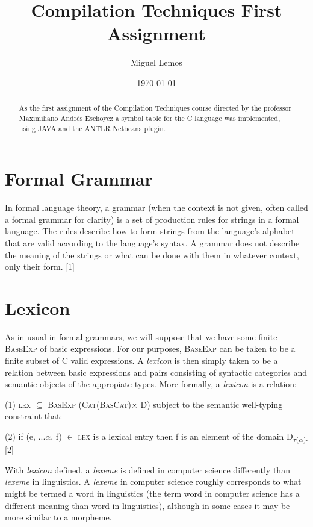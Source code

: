 \documentclass[twocolumn,10ptr]{article}
\author{Miguel Lemos}
\date{\today}
\title{Compilation Techniques First Assignment}
\begin{document}
	
	\twocolumn
	\setlength{\columnsep}{20pt}
	\maketitle
	
	\begin{abstract}
		As the first assignment of the Compilation Techniques course directed by the professor Maximiliano Andr\'{e}s Eschoyez a symbol table for the C language was implemented, using JAVA and the ANTLR Netbeans plugin.
	\end{abstract}
	
	
	
	\section{Formal Grammar}
	In formal language theory, a grammar (when the context is not given, often called a formal grammar for clarity) is a set of production rules for strings in a formal language. The rules describe how to form strings from the language's alphabet that are valid according to the language's syntax. A grammar does not describe the meaning of the strings or what can be done with them in whatever context, only their form.
	[1]
	
	
	
	\section{Lexicon}
	As in usual in formal grammars, we will suppose that we have some finite \textsc{BaseExp} of basic expressions. For our purposes, \textsc{BaseExp}  can be taken to be a finite subset of   C valid expressions. A \textit{lexicon} is then simply taken to be a relation between basic expressions and pairs consisting of syntactic categories and semantic objects of the appropiate types.
	More formally, a \textit{lexicon} is a relation:
	
	(1) \textsc{ lex} \( \subseteq \)  \textsc{ BasExp} (\textsc{Cat}(\textsc{BasCat})\(\times\) D)
	subject to the semantic well-typing constraint that:
	
	(2) if (e, ...\( \alpha \), f) \( \in \)   \textsc{ lex} is a lexical entry then f is an element of the domain D\textsubscript{\(\tau \)(\( \alpha \))\(\cdot\)} [2]
	
	With \textit{lexicon} defined, a \textit{lexeme} is defined in computer science differently than  \textit{lexeme}  in linguistics. A  \textit{lexeme}  in computer science roughly corresponds to what might be termed a word in linguistics (the term word in computer science has a different meaning than word in linguistics), although in some cases it may be more similar to a morpheme.
	
\end{document}
